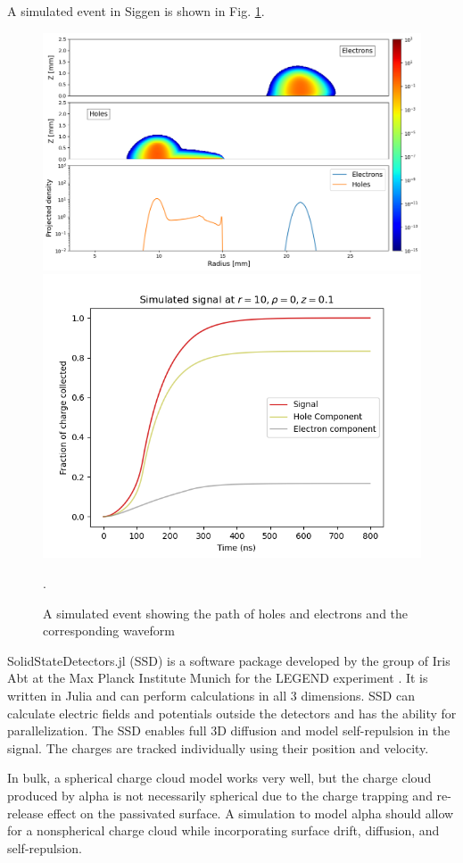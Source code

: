 A simulated event in Siggen is shown in Fig. \ref{fig:siggen_1d}.

\begin{figure}
\centering
\includegraphics[width=0.49\linewidth]{ch3/figs/drift_path.png}
\includegraphics[width=0.49\linewidth]{ch3/figs/samp_wav_comp.png}
\caption{A simulated event showing the path of holes and electrons and the corresponding waveform}.
\label{fig:siggen_1d}
\end{figure}

SolidStateDetectors.jl (SSD) is a software package developed by the group of Iris Abt at the Max Planck Institute Munich for the LEGEND experiment \cite{Abt:2021SSD}. It is written in Julia and can perform calculations in all 3 dimensions. SSD can calculate electric fields and potentials outside the detectors and has the ability for parallelization. The SSD enables full 3D diffusion and model self-repulsion in the signal. The charges are tracked individually using their position and velocity.

In bulk, a spherical charge cloud model works very well, but the charge cloud produced by alpha is not necessarily spherical due to the charge trapping and re-release effect on the passivated surface. A simulation to model alpha should allow for a nonspherical charge cloud while incorporating surface drift, diffusion, and self-repulsion.

